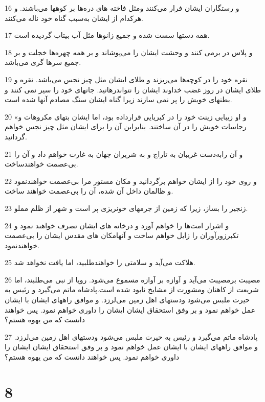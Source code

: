 \par 16 و رستگاران ایشان فرار می‌کنند ومثل فاخته های دره‌ها بر کوهها می‌باشند. و هرکدام از ایشان به‌سبب گناه خود ناله می‌کنند.
\par 17 همه دستها سست شده و جمیع زانوها مثل آب بیتاب گردیده است.
\par 18 و پلاس در برمی کنند و وحشت ایشان را می‌پوشاند و بر همه چهره‌ها خجلت و بر جمیع سرها گری می‌باشد.
\par 19 نقره خود را در کوچه‌ها می‌ریزند و طلای ایشان مثل چیز نجس می‌باشد. نقره و طلای ایشان در روز غضب خداوند ایشان را نتواندرهانید. جانهای خود را سیر نمی کنند و بطنهای خویش را پر نمی سازند زیرا گناه ایشان سنگ مصادم آنها شده است.
\par 20 «و او زیبایی زینت خود را در کبریایی قرارداده بود، اما ایشان بتهای مکروهات و رجاسات خویش را در آن ساختند. بنابراین آن را برای ایشان مثل چیز نجس خواهم گردانید.
\par 21 و آن رابه‌دست غریبان به تاراج و به شریران جهان به غارت خواهم داد و آن را بی‌عصمت خواهندساخت.
\par 22 و روی خود را از ایشان خواهم برگردانید و مکان مستور مرا بی‌عصمت خواهندنمود و ظالمان داخل آن شده، آن را بی‌عصمت خواهند ساخت.
\par 23 زنجیر را بساز، زیرا که زمین از جرمهای خونریزی پر است و شهر از ظلم مملو.
\par 24 و اشرار امت‌ها را خواهم آورد و درخانه های ایشان تصرف خواهند نمود و تکبرزورآوران را زایل خواهم ساخت و آنهامکان های مقدس ایشان را بی‌عصمت خواهندنمود.
\par 25 هلاکت می‌آید و سلامتی را خواهندطلبید، اما یافت نخواهد شد.
\par 26 مصیبت برمصیبت می‌آید و آوازه بر آوازه مسموع می‌شود. رویا از نبی می‌طلبند، اما شریعت از کاهنان ومشورت از مشایخ نابود شده است.پادشاه ماتم می‌گیرد و رئیس به حیرت ملبس می‌شود ودستهای اهل زمین می‌لرزد. و موافق راههای ایشان با ایشان عمل خواهم نمود و بر وفق استحقاق ایشان ایشان را داوری خواهم نمود. پس خواهند دانست که من یهوه هستم؟
\par 27 پادشاه ماتم می‌گیرد و رئیس به حیرت ملبس می‌شود ودستهای اهل زمین می‌لرزد. و موافق راههای ایشان با ایشان عمل خواهم نمود و بر وفق استحقاق ایشان ایشان را داوری خواهم نمود. پس خواهند دانست که من یهوه هستم؟

\chapter{8}

